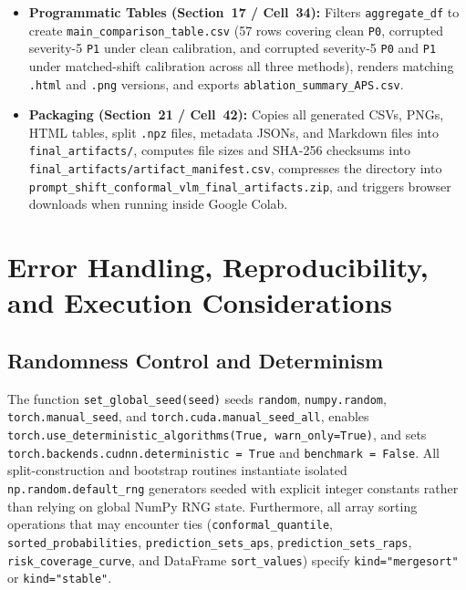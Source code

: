 \documentclass[11pt,a4paper]{article}
\begin{document}
\begin{itemize}
\begin{enumerate}
  \end{enumerate}
  \item \textbf{Programmatic Tables (Section~17 / Cell~34):} Filters \texttt{aggregate\_\allowbreak{}df} to create \texttt{main\_\allowbreak{}comparison\_\allowbreak{}table.csv} (57 rows covering clean \texttt{P0}, corrupted severity-5 \texttt{P1} under clean calibration, and corrupted severity-5 \texttt{P0} and \texttt{P1} under matched-shift calibration across all three methods), renders matching \texttt{.html} and \texttt{.png} versions, and exports \texttt{ablation\_\allowbreak{}summary\_\allowbreak{}APS.csv}.
  \item \textbf{Packaging (Section~21 / Cell~42):} Copies all generated CSVs, PNGs, HTML tables, split \texttt{.npz} files, metadata JSONs, and Markdown files into \texttt{final\_\allowbreak{}artifacts/\allowbreak{}}, computes file sizes and SHA-256 checksums into \texttt{final\_\allowbreak{}artifacts/\allowbreak{}artifact\_\allowbreak{}manifest.csv}, compresses the directory into \texttt{prompt\_\allowbreak{}shift\_\allowbreak{}conformal\_\allowbreak{}vlm\_\allowbreak{}final\_\allowbreak{}artifacts.zip}, and triggers browser downloads when running inside Google Colab.
\end{itemize}

\section{Error Handling, Reproducibility, and Execution Considerations}
\label{sec:reproducibility}

\subsection{Randomness Control and Determinism}
The function \texttt{set\_\allowbreak{}global\_\allowbreak{}seed(seed)} seeds \texttt{random}, \texttt{numpy.random}, \texttt{torch.manual\_\allowbreak{}seed}, and \texttt{torch.cuda.manual\_\allowbreak{}seed\_\allowbreak{}all}, enables \texttt{torch.use\_\allowbreak{}deterministic\_\allowbreak{}algorithms(True, warn\_\allowbreak{}only=True)}, and sets \texttt{torch.backends.cudnn.deterministic = True} and \texttt{benchmark = False}. All split-construction and bootstrap routines instantiate isolated \texttt{np.random.default\_\allowbreak{}rng} generators seeded with explicit integer constants rather than relying on global NumPy RNG state. Furthermore, all array sorting operations that may encounter ties (\texttt{conformal\_\allowbreak{}quantile}, \texttt{sorted\_\allowbreak{}probabilities}, \texttt{prediction\_\allowbreak{}sets\_\allowbreak{}aps}, \texttt{prediction\_\allowbreak{}sets\_\allowbreak{}raps}, \texttt{risk\_\allowbreak{}coverage\_\allowbreak{}curve}, and DataFrame \texttt{sort\_\allowbreak{}values}) specify \texttt{kind="mergesort"} or \texttt{kind="stable"}.
\end{document}
